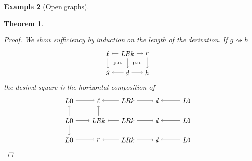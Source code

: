 \documentclass{amsart}
\newcommand{\dderiv}[2]{#1 \rightsquigarrow #2}
\newtheorem{theorem}{Theorem}[section]
\theoremstyle{remark}
\theoremstyle{definition}
\newtheorem{example}[theorem]{Example}
\begin{document}
\begin{example}[Open graphs]
{{\begin{theorem}
\begin{proof}
  We show sufficiency by induction on the length of the derivation. If
  $ \dderiv{g}{h} $
  \[
  \begin{tikzpicture}
    \node (1t) at (0,1) {$ \ell $};
    \node (2t) at (1,1) {$ LRk $};
    \node (3t) at (2,1) {$ r $};
    \node (1b) at (0,0) {$ g $};
    \node (2b) at (1,0) {$ d $};
    \node (3b) at (2,0) {$ h $};
    \draw [->] (2t) to node [] {\scriptsize{$  $}} (1t);
    \draw [->] (2t) to node [] {\scriptsize{$  $}} (3t);
    \draw [->] (2b) to node [] {\scriptsize{$  $}} (1b);
    \draw [->] (2b) to node [] {\scriptsize{$  $}} (3b);
    \draw [->] (1t) to node [] {\scriptsize{$  $}} (1b);
    \draw [->] (2t) to node [] {\scriptsize{$  $}} (2b);
    \draw [->] (3t) to node [] {\scriptsize{$  $}} (3b);
    \node () at (0.5,0.5) {\scriptsize{p.o.}};
    \node () at (1.5,0.5) {\scriptsize{p.o.}};
  \end{tikzpicture}
  \]
  the desired square is the horizontal composition of
  \[
    \begin{tikzpicture}
    \begin{scope}
      \node (1t) at (0,2) {$ L0 $};
      \node (2t) at (1.5,2) {$ \ell $};
      \node (3t) at (3,2) {$ LRk $};
      \node (4t) at (4.5,2) {$ d $};
      \node (5t) at (6,2) {$ L0 $};
      \node (1m) at (0,1) {$ L 0 $};
      \node (2m) at (1.5,1) {$ LRk $};
      \node (3m) at (3,1) {$ LRk $};
      \node (4m) at (4.5,1) {$ d $};
      \node (5m) at (6,1) {$ L 0 $};
      \node (1b) at (0,0) {$ L 0 $};
      \node (2b) at (1.5,0) {$ r $};
      \node (3b) at (3,0) {$ LRk $};
      \node (4b) at (4.5,0) {$ d $};
      \node (5b) at (6,0) {$ L 0 $};
      \draw [->] (1t) to node [] {\scriptsize{$  $}} (2t);
      \draw [->] (3t) to node [] {\scriptsize{$  $}} (2t);
      \draw [->] (3t) to node [] {\scriptsize{$  $}} (4t);
      \draw [->] (5t) to node [] {\scriptsize{$  $}} (4t);
      \draw [->] (1m) to node [] {\scriptsize{$  $}} (2m);
      \draw [->] (3m) to node [] {\scriptsize{$  $}} (2m);
      \draw [->] (3m) to node [] {\scriptsize{$  $}} (4m);
      \draw [->] (5m) to node [] {\scriptsize{$  $}} (4m);
      \draw [->] (1b) to node [] {\scriptsize{$  $}} (2b);
      \draw [->] (3b) to node [] {\scriptsize{$  $}} (2b);
      \draw [->] (3b) to node [] {\scriptsize{$  $}} (4b);
      \draw [->] (5b) to node [] {\scriptsize{$  $}} (4b);
      \draw [->] (1m) to node [] {\scriptsize{$  $}} (1t);
      \draw [->] (1m) to node [] {\scriptsize{$  $}} (1b);
      \draw [->] (2m) to node [] {\scriptsize{$  $}} (2t);

\end{scope}
\end{tikzpicture}\]
\end{proof}
\end{theorem}}}
\end{example}
\end{document}
